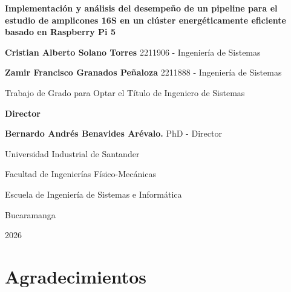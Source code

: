 \documentclass[12pt,oneside,spanish]{book}
\begin{document}
    
    
    \begin{titlepage}
        \centering
        \vspace*{1cm}
    
        {\Large \textbf{Implementación y análisis del desempeño de un pipeline para el estudio de amplicones 16S en un clúster energéticamente eficiente basado en Raspberry Pi 5}}
    
        \vspace{2cm}
    
        {\large \textbf{Cristian Alberto Solano Torres} 2211906 - Ingeniería de Sistemas}
    
        {\large \textbf{Zamir Francisco Granados Peñaloza} 2211888 - Ingeniería de Sistemas}
    
        \vspace{2cm}
    
        {\large Trabajo de Grado para Optar el Título de Ingeniero de Sistemas}
    
        \vspace{2cm}
    
        {\large \textbf{Director}}
    
        {\large \textbf{Bernardo Andrés Benavides Arévalo.} PhD - Director}
    
        \vspace{\fill}
    
        {\large Universidad Industrial de Santander}
    
        {\large Facultad de Ingenierías Físico-Mecánicas}
    
        {\large Escuela de Ingeniería de Sistemas e Informática}
    
        {\large Bucaramanga}
    
        {\large 2026}
    
    \end{titlepage}
    
    
    \chapter*{Agradecimientos}
    
\end{document}
